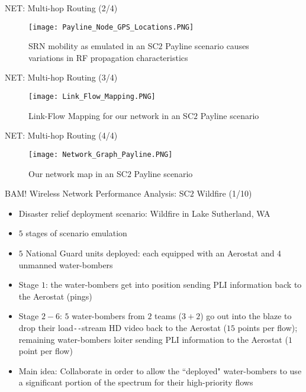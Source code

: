\documentclass{beamer}
\begin{document}
\begin{frame}{NET: Multi-hop Routing (2/4)}
\begin{figure}
    \centering
    \texttt{[image: Payline\_Node\_GPS\_Locations.PNG]}
    \caption{SRN mobility as emulated in an SC$2$ Payline scenario causes variations in RF propagation characteristics}
    \label{fig:17}
\end{figure}
\end{frame}
\begin{frame}{NET: Multi-hop Routing (3/4)}
\begin{figure}
    \centering
    \texttt{[image: Link\_Flow\_Mapping.PNG]}
    \caption{Link-Flow Mapping for our network in an SC$2$ Payline scenario}
    \label{fig:18}
\end{figure}
\end{frame}
\begin{frame}{NET: Multi-hop Routing (4/4)}
\begin{figure}
    \centering
    \texttt{[image: Network\_Graph\_Payline.PNG]}
    \caption{Our network map in an SC$2$ Payline scenario}
    \label{fig:19}
\end{figure}
\end{frame}
\begin{frame}{BAM! Wireless Network Performance Analysis: SC$2$ Wildfire (1/10)}
    \footnotesize{\begin{itemize}
        \item Disaster relief deployment scenario: Wildfire in Lake Sutherland, WA
        \item $5$ stages of scenario emulation
        \item $5$ National Guard units deployed: each equipped with an Aerostat and $4$ unmanned water-bombers
        \item Stage $1$: the water-bombers get into position sending PLI information back to the Aerostat (pings)
        \item Stage $2{-}6$: $5$ water-bombers from $2$ teams ($3{+}2$) go out into the blaze to drop their load\texttt{-{}-}stream HD video back to the Aerostat ($15$ points per flow); remaining water-bombers loiter sending PLI information to the Aerostat ($1$ point per flow)
        \item Main idea: Collaborate in order to allow the ``deployed" water-bombers to use a significant portion of the spectrum for their high-priority flows
    \end{itemize}}
\end{frame}
\end{document}
